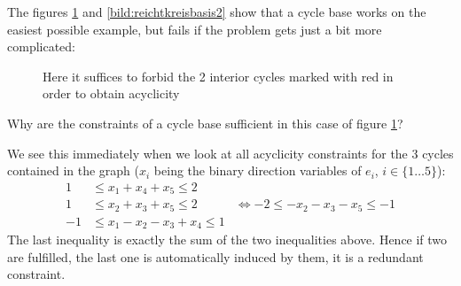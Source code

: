 The figures \ref{bild:reichtkreisbasis1} and \ref{bild:reichtkreisbasis2} %
show that a cycle base works on the easiest possible example, but fails if the problem gets just a bit more complicated:

\begin{figure}[h!]
\centering
{}
\caption{Here it suffices to forbid the 2 interior cycles marked with red in order to obtain acyclicity}
\label{bild:reichtkreisbasis1}
\end{figure}

Why are the constraints of a cycle base sufficient in this case of figure \ref{bild:reichtkreisbasis1}? 

We see this immediately when we look at all acyclicity constraints for the 3 cycles contained in the graph 
($x_i$ being the binary direction variables of $e_i$, $i\in\{1\dots 5\}$):
\begin{align*}
 1 &\le x_1+x_4+x_5\le 2&\\
 1&\le x_2+x_3+x_5\le 2& \iff -2\le -x_2-x_3-x_5\le -1\\
 -1 &\le x_1-x_2-x_3+x_4 \le 1&
\end{align*}
The last inequality is exactly the sum of the two inequalities above. Hence if two are fulfilled, the last one is 
automatically induced by them, it is a redundant constraint.

